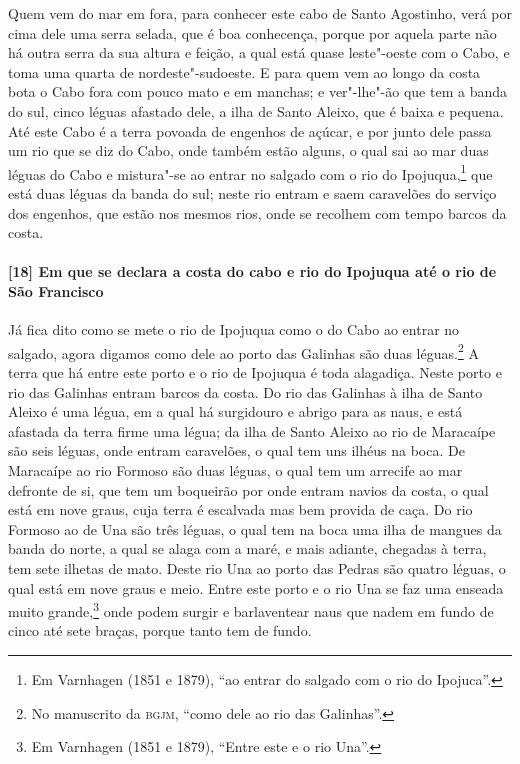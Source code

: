 Quem vem do mar em fora, para conhecer este cabo de Santo Agostinho, verá por cima dele
uma serra selada, que é boa conhecença, porque por aquela parte não há outra serra da sua
altura e feição, a qual está quase leste"-oeste com o Cabo, e toma uma quarta de
nordeste"-sudoeste. E para quem vem ao longo da costa bota o Cabo fora com pouco mato e em
manchas; e ver"-lhe"-ão que tem a banda do sul, cinco léguas afastado dele, a ilha de Santo
Aleixo, que é baixa e pequena. Até este Cabo é a terra povoada de engenhos de açúcar, e
por junto dele passa um rio que se diz do Cabo, onde também estão alguns, o qual sai ao
mar duas léguas do Cabo e mistura"-se ao entrar no salgado com o rio do Ipojuqua,\footnote{
Em Varnhagen (1851 e 1879), ``ao entrar do salgado com o rio do Ipojuca''.} que está duas
léguas da banda do sul; neste rio entram e saem caravelões do serviço dos engenhos, que
estão nos mesmos rios, onde se recolhem com tempo barcos da costa.

\paragraph{[18] Em que se declara a costa do cabo e rio do Ipojuqua até o rio de São
Francisco} \quad
Já fica dito como se mete o rio de Ipojuqua como o do Cabo ao entrar no salgado, agora
digamos como dele ao porto das Galinhas são duas léguas.\footnote{ No manuscrito da
\textsc{bgjm}, ``como dele ao rio das Galinhas''.} A terra que há entre este porto e o rio
de Ipojuqua é toda alagadiça. Neste porto e rio das Galinhas entram barcos da costa. Do
rio das Galinhas à ilha de Santo Aleixo é uma légua, em a qual há surgidouro e abrigo para
as naus, e está afastada da terra firme uma légua; da ilha de Santo Aleixo ao rio de
Maracaípe são seis léguas, onde entram caravelões, o qual tem uns ilhéus na boca. De
Maracaípe ao rio Formoso são duas léguas, o qual tem um arrecife ao mar defronte de si,
que tem um boqueirão por onde entram navios da costa, o qual está em nove graus, cuja
terra é escalvada mas bem provida de caça. Do rio Formoso ao de Una são três léguas, o
qual tem na boca uma ilha de mangues da banda do norte, a qual se alaga com a maré, e mais
adiante, chegadas à terra, tem sete ilhetas de mato. Deste rio Una ao porto das Pedras são
quatro léguas, o qual está em nove graus e meio. Entre este porto e o rio Una se faz uma
enseada muito grande,\footnote{ Em Varnhagen (1851 e 1879), ``Entre este e o rio Una''.}
onde podem surgir e barlaventear naus que nadem em fundo de cinco até sete braças, porque
tanto tem de fundo.

